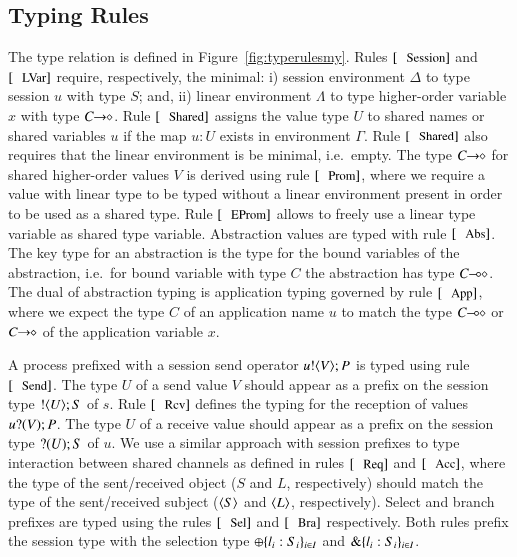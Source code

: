 
\subsection{Typing Rules}



The type relation is defined in Figure~\ref{fig:typerulesmy}.
Rules $\trule{Session}$ and $\trule{LVar}$ require,
respectively, the minimal:
i) session environment $\Delta$ to type session 
$u$ with type $S$; and,
ii) linear environment $\Lambda$ to type 
higher-order variable $x$ with type $C\!\! \rightarrow\!\! \diamond$.
Rule $\trule{Shared}$
assigns the value type $U$
to shared names or shared variables $u$ 
if the map $u:U$ exists in environment
$\Gamma$. Rule $\trule{Shared}$ also requires 
that the linear environment is
be minimal, i.e.~empty.
The type $C\!\! \rightarrow\!\! \diamond$ for shared higher-order values $V$
is derived using rule $\trule{Prom}$, where we require
a value with linear type to be typed without a linear
environment present in order to be used as a shared type.
Rule $\trule{EProm}$ allows to freely use a linear
type variable as shared type variable. 
Abstraction values are typed with rule $\trule{Abs}$.
The key type for an abstraction is the type for
the bound variables of the abstraction, i.e.~for
bound variable with type $C$ the abstraction
has type $C\!\! \multimap\!\! \diamond$.
The dual of abstraction typing is application typing
governed by rule $\trule{App}$, where we expect
the type $C$ of an application name $u$ 
to match the type $C\!\! \multimap\!\! \diamond$ or $C\!\! \rightarrow\!\! \diamond$
of the application variable $x$.

A process prefixed with a session send operator $u ! \langle V \rangle ; P$
is typed using rule $\trule{Send}$.
The type $U$ of a send value $V$ should appear as a prefix
on the session type $! \langle U \rangle ; S$ of $s$.
Rule $\trule{Rcv}$
defines the typing for the 
reception of values $u ? (V) ; P$.
The type $U$ of a receive value should 
appear as a prefix on the session type $? (U) ; S$ of $u$.
We use a similar approach with session prefixes
to type interaction between shared channels as defined 
in rules $\trule{Req}$ and $\trule{Acc}$,
where the type of the sent/received object 
($S$ and $L$, respectively) should
match the type of the sent/received subject
($\langle S \rangle$ and $\langle L \rangle$, respectively).
Select and branch prefixes are typed using the rules
$\trule{Sel}$ and $\trule{Bra}$ respectively. Both
rules prefix the session type with the selection
type $\oplus \{l_i: S_i\}_{i \in I}$ and
$\& \{l_i:S_i\}_{i \in I}$.

